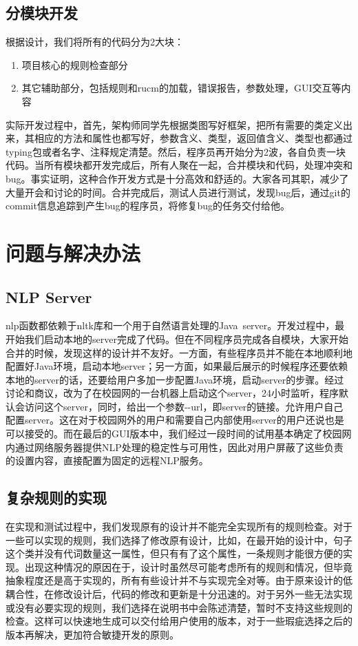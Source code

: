     \subsection{分模块开发}
    根据设计，我们将所有的代码分为2大块：
    \begin{enumerate}
        \item
        项目核心的规则检查部分
        \item
        其它辅助部分，包括规则和rucm的加载，错误报告，参数处理，GUI交互等内容
    \end{enumerate}


    实际开发过程中，首先，架构师同学先根据类图写好框架，把所有需要的类定义出来，其相应的方法和属性也都写好，参数含义、类型，返回值含义、类型也都通过typing包或者名字、注释规定清楚。然后，程序员再开始分为2波，各自负责一块代码。当所有模块都开发完成后，所有人聚在一起，合并模块和代码，处理冲突和bug。事实证明，这种合作开发方式是十分高效和舒适的。大家各司其职，减少了大量开会和讨论的时间。合并完成后，测试人员进行测试，发现bug后，通过git的commit信息追踪到产生bug的程序员，将修复bug的任务交付给他。
\section{问题与解决办法}
    \subsection{NLP Server}
    nlp函数都依赖于nltk库和一个用于自然语言处理的Java\ server。开发过程中，最开始我们启动本地的server完成了代码。但在不同程序员完成各自模块，大家开始合并的时候，发现这样的设计并不友好。一方面，有些程序员并不能在本地顺利地配置好Java环境，启动本地server；另一方面，如果最后展示的时候程序还要依赖本地的server的话，还要给用户多加一步配置Java环境，启动server的步骤。经过讨论和商议，改为了在校园网的一台机器上启动这个server，24小时监听，程序默认会访问这个server，同时，给出一个参数-\/-url，即server的链接。允许用户自己配置server。这在对于校园网外的用户和需要自己内部使用server的用户还说也是可以接受的。而在最后的GUI版本中，我们经过一段时间的试用基本确定了校园网内通过网络服务器提供NLP处理的稳定性与可用性，因此对用户屏蔽了这些负责的设置内容，直接配置为固定的远程NLP服务。
    \subsection{复杂规则的实现}
    在实现和测试过程中，我们发现原有的设计并不能完全实现所有的规则检查。对于一些可以实现的规则，我们选择了修改原有设计，比如，在最开始的设计中，句子这个类并没有代词数量这一属性，但只有有了这个属性，一条规则才能很方便的实现。出现这种情况的原因在于，设计时虽然尽可能考虑所有的规则和情况，但毕竟抽象程度还是高于实现的，所有有些设计并不与实现完全对等。由于原来设计的低耦合性，在修改设计后，代码的修改和更新是十分迅速的。对于另外一些无法实现或没有必要实现的规则，我们选择在说明书中会陈述清楚，暂时不支持这些规则的检查。这样可以快速地生成可以交付给用户使用的版本，对于一些瑕疵选择之后的版本再解决，更加符合敏捷开发的原则。
